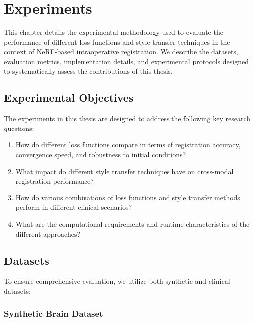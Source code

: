 
\chapter{Experiments}\label{chapter:experiments}

This chapter details the experimental methodology used to evaluate the performance of different loss functions and style transfer techniques in the context of NeRF-based intraoperative registration. We describe the datasets, evaluation metrics, implementation details, and experimental protocols designed to systematically assess the contributions of this thesis.

\section{Experimental Objectives}

The experiments in this thesis are designed to address the following key research questions:

\begin{enumerate}
    \item How do different loss functions compare in terms of registration accuracy, convergence speed, and robustness to initial conditions?
    
    \item What impact do different style transfer techniques have on cross-modal registration performance?
    
    \item How do various combinations of loss functions and style transfer methods perform in different clinical scenarios?
    
    \item What are the computational requirements and runtime characteristics of the different approaches?
\end{enumerate}

\section{Datasets}

To ensure comprehensive evaluation, we utilize both synthetic and clinical datasets:

\subsection{Synthetic Brain Dataset}

